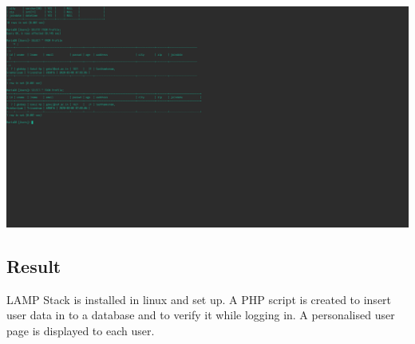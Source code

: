 \documentclass{article}
\begin{document}
\includegraphics[width=1\textwidth]{img/p25/ss5.png}

\newpage

\subsection{Result}
LAMP Stack is installed in linux and set up. A PHP script is created
to insert user data in to a database and to verify it while logging in.
A personalised user page is displayed to each user.
\end{document}
